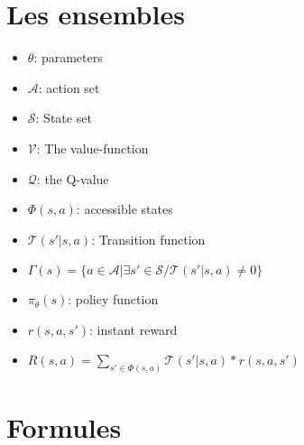 \documentclass[8pt,a4paper]{extarticle}
\begin{document}
\section*{Les ensembles}

\begin{multicols}{2}

\begin{itemize}

\item
  $\theta$: parameters
\item
  $\mathcal{A}$: action set
\item
  $\mathcal{S}$: State set
\item
  $\mathcal V$: The value-function
\item
  $\mathcal Q$: the Q-value
\item
  $\Phi(s, a)$: accessible states 

\item
  $\mathcal T(s' | s, a)$: Transition function
  
\item
  $\Gamma (s) = \{ a \in \mathcal{A} | \exists s' \in \mathcal S / \mathcal T (s' | s, a) \neq 0 \}$

\item
  $\pi_{\theta}(s)$: policy function

\item
  $r(s, a, s')$: instant reward

\item
  $R(s, a)= \sum_{s' \in \Phi(s, a)} \mathcal T(s' | s, a)* r(s, a, s')$
 
\end{itemize}

\end{multicols}

\section*{Formules}
\end{document}
